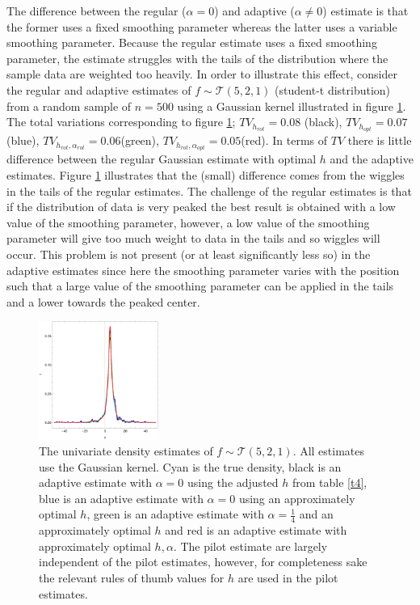 \documentclass[
twoside,
openright,
titlepage,
numbers=noenddot,
headinclude,%
footinclude=true,
dottedtoc, %
ngerman,
american, %
pagesize=pdftex,
]{book}
\begin{document}
	\begin{example}
		The difference between the regular ($\alpha=0$) and adaptive ($\alpha\neq 0$) estimate is that the former uses a fixed smoothing parameter whereas the latter uses a variable smoothing parameter. Because the regular estimate uses a fixed smoothing parameter, the estimate struggles with the tails of the distribution where the sample data are weighted too heavily. In order to illustrate this effect, consider the regular and adaptive estimates of $f\sim \mathcal{T}(5,2,1)$ (student-t distribution) from a random sample of $n=500$ using a Gaussian kernel illustrated in figure \ref{fig:4}. The total variations corresponding to figure \ref{fig:4}; $TV_{h_{rot}}=0.08$ (black), $TV_{h_{opt}}=0.07$(blue), $TV_{h_{rot},\alpha_{rot}}=0.06$(green), $TV_{h_{rot},\alpha_{opt}}=0.05$(red). In terms of $TV$ there is little difference between the regular Gaussian estimate with optimal $h$ and the adaptive estimates. Figure \ref{fig:4} illustrates that the (small) difference comes from the wiggles in the tails of the regular estimates. The challenge of the regular estimates is that if the distribution of data is very peaked the best result is obtained with a low value of the smoothing parameter, however, a low value of the smoothing parameter will give too much weight to data in the tails and so wiggles will occur. This problem is not present (or at least significantly less so) in the adaptive estimates since here the smoothing parameter varies with the position such that a large value of the smoothing parameter can be applied in the tails and a lower towards the peaked center.
		\begin{figure}[H]
			\centering
			\captionsetup{width=0.95\textwidth}
			\includegraphics[width=0.35\textwidth]{figures/explain.pdf}
			\caption{The univariate density estimates of $f\sim \mathcal{T}(5,2,1)$. All estimates use the Gaussian kernel. Cyan is the true density, black is an adaptive estimate with $\alpha=0$ using the adjusted $h$ from table \ref{t4}, blue is an adaptive estimate with $\alpha=0$ using an approximately optimal $h$, green is an adaptive estimate with $\alpha=\frac{1}{4}$ and an approximately optimal $h$ and red is an adaptive estimate with approximately optimal $h,\alpha$. The pilot estimate are largely independent of the pilot estimates, however, for completeness sake the relevant rules of thumb values for $h$ are used in the pilot estimates.}
			\label{fig:4}
		\end{figure} 	
	\end{example}
	
\end{document}
